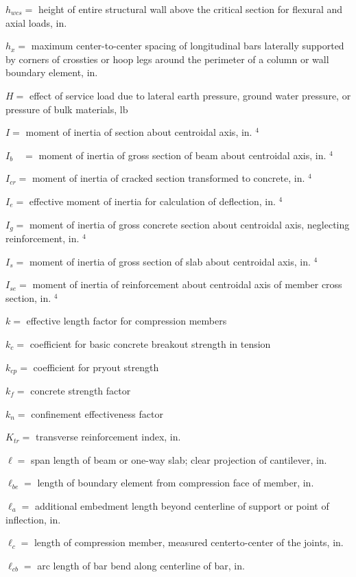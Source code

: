 \documentclass[10pt]{article}
\begin{document}
$h_{w c s}=$ height of entire structural wall above the critical section for flexural and axial loads, in.

$h_{x}=$ maximum center-to-center spacing of longitudinal bars laterally supported by corners of crossties or hoop legs around the perimeter of a column or wall boundary element, in.

$H=$ effect of service load due to lateral earth pressure, ground water pressure, or pressure of bulk materials, $\mathrm{lb}$

$I=$ moment of inertia of section about centroidal axis, in. ${ }^{4}$

$I_{b} \quad=$ moment of inertia of gross section of beam about centroidal axis, in. ${ }^{4}$

$I_{c r}=$ moment of inertia of cracked section transformed to concrete, in. ${ }^{4}$

$I_{e}=$ effective moment of inertia for calculation of deflection, in. ${ }^{4}$

$I_{g}=$ moment of inertia of gross concrete section about centroidal axis, neglecting reinforcement, in. ${ }^{4}$

$I_{s}=$ moment of inertia of gross section of slab about centroidal axis, in. ${ }^{4}$

$I_{s e}=$ moment of inertia of reinforcement about centroidal axis of member cross section, in. ${ }^{4}$

$k=$ effective length factor for compression members

$k_{c}=$ coefficient for basic concrete breakout strength in tension

$k_{c p}=$ coefficient for pryout strength

$k_{f}=$ concrete strength factor

$k_{n}=$ confinement effectiveness factor

$K_{t r}=$ transverse reinforcement index, in.

$\ell=$ span length of beam or one-way slab; clear projection of cantilever, in.

$\ell_{b e}=$ length of boundary element from compression face of member, in.

$\ell_{a}=$ additional embedment length beyond centerline of support or point of inflection, in.

$\ell_{c}=$ length of compression member, measured centerto-center of the joints, in.

$\ell_{c b}=$ arc length of bar bend along centerline of bar, in.
\end{document}
